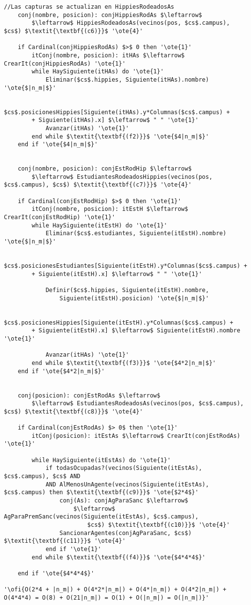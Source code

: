 \begin{lstlisting}[mathescape]
	//Las capturas se actualizan en HippiesRodeadosAs
	conj(nombre, posicion): conjHippiesRodAs $\leftarrow$
		$\leftarrow$ HippiesRodeadosAs(vecinos(pos, $cs$.campus), $cs$) $\textit{\textbf{(c6)}}$ '\ote{4}'

	if Cardinal(conjHippiesRodAs) $>$ 0 then '\ote{1}'
		itConj(nombre, posicion): itHAs $\leftarrow$ CrearIt(conjHippiesRodAs) '\ote{1}'
		while HaySiguiente(itHAs) do '\ote{1}'
			Eliminar($cs$.hippies, Siguiente(itHAs).nombre) '\ote{$|n_m|$}'

			$cs$.posicionesHippies[Siguiente(itHAs).y*Columnas($cs$.campus) +
		+ Siguiente(itHAs).x] $\leftarrow$ " " '\ote{1}'
			Avanzar(itHAs) '\ote{1}'
		end while $\textit{\textbf{(f2)}}$ '\ote{$4|n_m|$}'
	end if '\ote{$4|n_m|$}'


	conj(nombre, posicion): conjEstRodHip $\leftarrow$
		$\leftarrow$ EstudiantesRodeadosHippies(vecinos(pos, $cs$.campus), $cs$) $\textit{\textbf{(c7)}}$ '\ote{4}'

	if Cardinal(conjEstRodHip) $>$ 0 then '\ote{1}'
		itConj(nombre, posicion): itEstH $\leftarrow$ CrearIt(conjEstRodHip) '\ote{1}'
		while HaySiguiente(itEstH) do '\ote{1}'
			Eliminar($cs$.estudiantes, Siguiente(itEstH).nombre) '\ote{$|n_m|$}'

			$cs$.posicionesEstudiantes[Siguiente(itEstH).y*Columnas($cs$.campus) +
		+ Siguiente(itEstH).x] $\leftarrow$ " " '\ote{1}'

			Definir($cs$.hippies, Siguiente(itEstH).nombre,
				Siguiente(itEstH).posicion) '\ote{$|n_m|$}'

			$cs$.posicionesHippies[Siguiente(itEstH).y*Columnas($cs$.campus) +
		+ Siguiente(itEstH).x] $\leftarrow$ Siguiente(itEstH).nombre '\ote{1}'

			Avanzar(itHAs) '\ote{1}'
		end while $\textit{\textbf{(f3)}}$ '\ote{$4*2|n_m|$}'
	end if '\ote{$4*2|n_m|$}'


	conj(posicion): conjEstRodAs $\leftarrow$
		$\leftarrow$ EstudiantesRodeadosAs(vecinos(pos, $cs$.campus), $cs$) $\textit{\textbf{(c8)}}$ '\ote{4}'

	if Cardinal(conjEstRodAs) $> 0$ then '\ote{1}'
		itConj(posicion): itEstAs $\leftarrow$ CrearIt(conjEstRodAs) '\ote{1}'

		while HaySiguiente(itEstAs) do '\ote{1}'
			if todasOcupadas?(vecinos(Siguiente(itEstAs), $cs$.campus), $cs$ AND
			AND AlMenosUnAgente(vecinos(Siguiente(itEstAs), $cs$.campus) then $\textit{\textbf{(c9)}}$ '\ote{$2*4$}'
				conj(As): conjAgParaSanc $\leftarrow$
					$\leftarrow$ AgParaPremSanc(vecinos(Siguiente(itEstAs), $cs$.campus),
						$cs$) $\textit{\textbf{(c10)}}$ '\ote{4}'
				SancionarAgentes(conjAgParaSanc, $cs$) $\textit{\textbf{(c11)}}$ '\ote{4}'
			end if '\ote{1}'
		end while $\textit{\textbf{(f4)}}$ '\ote{$4*4*4$}'

	end if '\ote{$4*4*4$}'

'\ofi{O(2*4 + |n_m|) + O(4*2*|n_m|) + O(4*|n_m|) + O(4*2|n_m|) + O(4*4*4) = O(8) + O(21|n_m|) = O(1) + O(|n_m|) = O(|n_m|)}'
\end{lstlisting}

